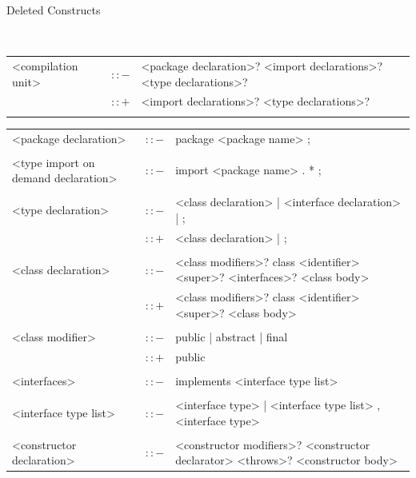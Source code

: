 \documentclass[landscape, 11pt]{article}
\begin{document}
\def\arraystretch{1}

\begin{qsection}{Deleted Constructs}

	\begin{enumerate}[label=\bt{\theenumi.}]
		\tt
		\ditem[Programs.]

			\begin{longtable}{R{7cm} c L{15cm}}
				<compilation unit>							&	$\colon\colon-$	&	<package declaration>? <import declarations>? <type declarations>? \\
															&	$\colon\colon+$	&	<import declarations>? <type declarations>? \\\\
			\end{longtable}
		\ditem[Declarations.]

			\begin{longtable}{R{7cm} c L{15cm}}
				<package declaration>						&	$\colon\colon-$	&	package <package name> ; \\\\
				<type import on demand declaration>			&	$\colon\colon-$	&	import <package name> . * ; \\\\
				<type declaration>							&	$\colon\colon-$	&	<class declaration> | <interface declaration> | ; \\
															&	$\colon\colon+$	&	<class declaration> | ; \\\\
				<class declaration>							&	$\colon\colon-$	&	<class modifiers>? class <identifier> <super>? <interfaces>? <class body> \\
															&	$\colon\colon+$	&	<class modifiers>? class <identifier> <super>? <class body> \\\\
				<class modifier>							&	$\colon\colon-$	&	public | abstract | final \\
															&	$\colon\colon+$	&	public \\\\
				<interfaces>								&	$\colon\colon-$	&	implements <interface type list> \\\\
				<interface type list>						&	$\colon\colon-$	&	<interface type> | <interface type list> , <interface type> \\\\
				<constructor declaration>					&	$\colon\colon-$	&	<constructor modifiers>? <constructor declarator> <throws>? <constructor body> \\

\end{longtable}
\end{enumerate}
\end{qsection}
\end{document}
